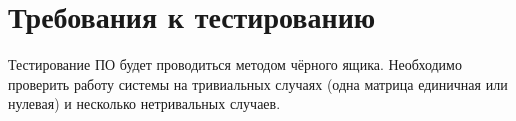     \section{Требования к тестированию}
    Тестирование ПО будет проводиться методом чёрного ящика. Необходимо проверить работу системы 
    на тривиальных случаях (одна матрица единичная или нулевая) 
    и несколько нетривальных случаев.

\newpage